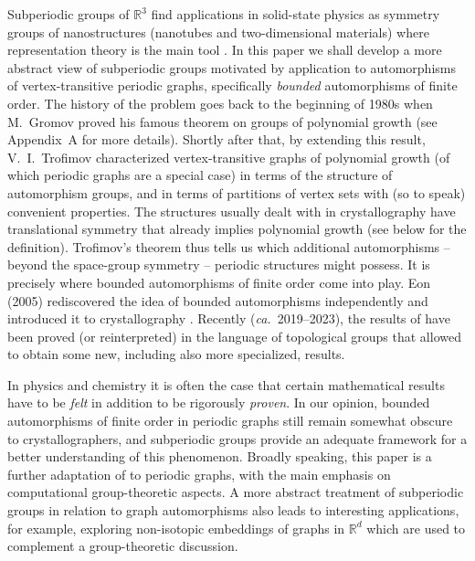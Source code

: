 \documentclass[11pt,a4paper]{article}
\newcommand{\R}{\mathbb R}
\begin{document}
Subperiodic groups of $\R^3$ find applications in solid-state physics as symmetry groups of nanostructures (nanotubes and two-dimensional materials) where representation theory is the main tool \cite{Linegr10}. In this paper we shall develop a more abstract view of subperiodic groups motivated by application to automorphisms of vertex-transitive periodic graphs, specifically \emph{bounded} automorphisms of finite order. The history of the problem goes back to the beginning of 1980s when M.~Gromov proved his famous theorem on groups of polynomial growth \cite{Gromov81} (see Appendix~A for more details). Shortly after that, by extending this result, V.~I.~Trofimov \cite{Trofimov84} characterized vertex-transitive graphs of polynomial growth (of which periodic graphs are a special case) in terms of the structure of automorphism groups, and in terms of partitions of vertex sets with (so to speak) convenient properties. The structures usually dealt with in crystallography have translational symmetry that already implies polynomial growth (see below for the definition). Trofimov's theorem \cite{Trofimov84} thus tells us which additional automorphisms -- beyond the space-group symmetry -- periodic structures might possess. It is precisely where bounded automorphisms of finite order come into play. Eon (2005) rediscovered the idea of bounded automorphisms independently and introduced it to crystallography \cite{Eon2005}. Recently (\emph{ca.}~2019--2023), the results of \cite{Trofimov84} have been proved (or reinterpreted) in the language of topological groups \cite{Salle19, Tes21} that allowed to obtain some new, including also more specialized, results.

In physics and chemistry it is often the case that certain mathematical results have to be \emph{felt} in addition to be rigorously \emph{proven}. In our opinion, bounded automorphisms of finite order in periodic graphs still remain somewhat obscure to crystallographers, and subperiodic groups provide an adequate framework for a better understanding of this phenomenon. Broadly speaking, this paper is a further adaptation of \cite{Trofimov84} to periodic graphs, with the main emphasis on computational group-theoretic aspects. A more abstract treatment of subperiodic groups in relation to graph automorphisms also leads to interesting applications, for example, exploring non-isotopic embeddings of graphs in $\R^d$ which are used to complement a group-theoretic discussion. %
\end{document}
